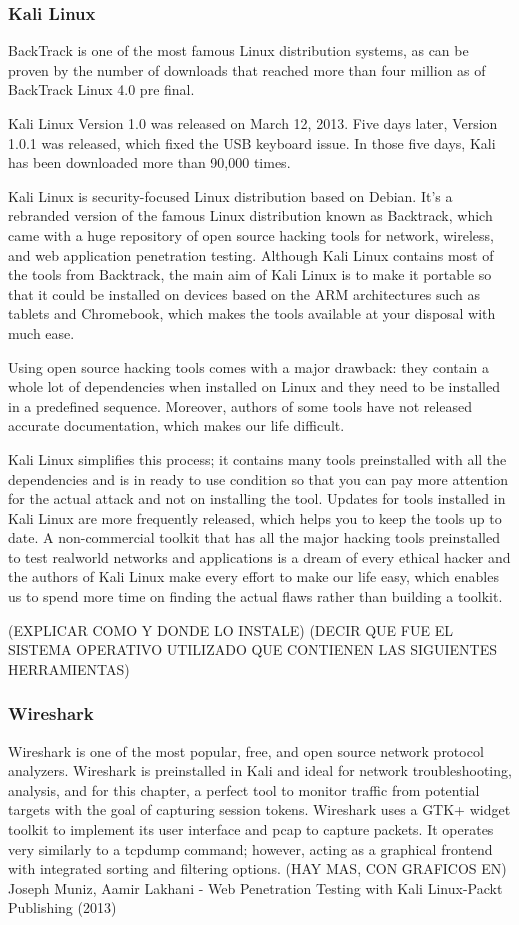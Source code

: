 
\subsubsection{Kali Linux}
    BackTrack is one of the most famous Linux distribution systems, as can be proven by
the number of downloads that reached more than four million as of BackTrack Linux
4.0 pre final.

Kali Linux Version 1.0 was released on March 12, 2013. Five days later, Version 1.0.1
was released, which fixed the USB keyboard issue. In those five days, Kali has been
downloaded more than 90,000 times.

    Kali Linux is security-focused Linux distribution based on Debian. It's a rebranded
    version of the famous Linux distribution known as Backtrack, which came with
    a huge repository of open source hacking tools for network, wireless, and web
    application penetration testing. Although Kali Linux contains most of the tools
    from Backtrack, the main aim of Kali Linux is to make it portable so that it could
    be installed on devices based on the ARM architectures such as tablets and
    Chromebook, which makes the tools available at your disposal with much ease.

    Using open source hacking tools comes with a major drawback: they contain a
whole lot of dependencies when installed on Linux and they need to be installed in
a predefined sequence. Moreover, authors of some tools have not released accurate
documentation, which makes our life difficult.

Kali Linux simplifies this process; it contains many tools preinstalled with all the
dependencies and is in ready to use condition so that you can pay more attention
for the actual attack and not on installing the tool. Updates for tools installed in Kali
Linux are more frequently released, which helps you to keep the tools up to date. A
non-commercial toolkit that has all the major hacking tools preinstalled to test realworld networks and applications is a dream of every ethical hacker and the authors
of Kali Linux make every effort to make our life easy, which enables us to spend
more time on finding the actual flaws rather than building a toolkit.

(EXPLICAR COMO Y DONDE LO INSTALE)
(DECIR QUE FUE EL SISTEMA OPERATIVO UTILIZADO QUE CONTIENEN LAS SIGUIENTES HERRAMIENTAS)
\subsubsection{Wireshark}
Wireshark is one of the most popular, free, and open source network protocol
analyzers. Wireshark is preinstalled in Kali and ideal for network troubleshooting,
analysis, and for this chapter, a perfect tool to monitor traffic from potential targets
with the goal of capturing session tokens. Wireshark uses a GTK+ widget toolkit to
implement its user interface and pcap to capture packets. It operates very similarly to
a tcpdump command; however, acting as a graphical frontend with integrated sorting
and filtering options.
(HAY MAS, CON GRAFICOS EN)
Joseph Muniz, Aamir Lakhani - Web Penetration Testing with Kali Linux-Packt Publishing (2013)

